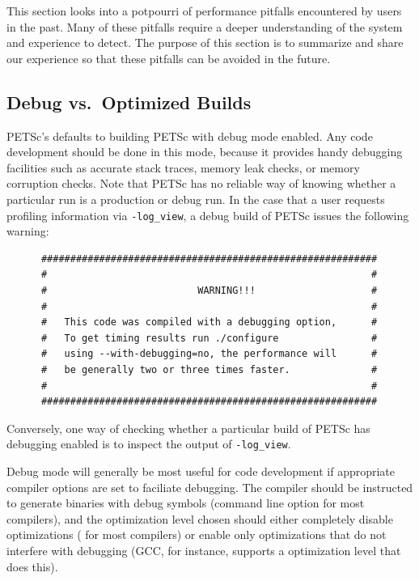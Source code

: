 {{This section looks into a potpourri of performance pitfalls encountered by users in the past.
Many of these pitfalls require a deeper understanding of the system and experience to detect.
The purpose of this section is to summarize and share our experience so that these pitfalls can be avoided in the future.

\subsection{Debug vs.\ Optimized Builds}

PETSc's  defaults to building PETSc with debug mode enabled.
Any code development should be done in this mode, because it provides handy debugging facilities such as accurate stack traces, memory leak checks, or memory corruption checks.
Note that PETSc has no reliable way of knowing whether a particular run is a production or debug run.
In the case that a user requests profiling information via \lstinline|-log_view|, a debug build of PETSc issues the following warning:
\begin{lstlisting}
      ##########################################################
      #                                                        #
      #                          WARNING!!!                    #
      #                                                        #
      #   This code was compiled with a debugging option,      #
      #   To get timing results run ./configure                #
      #   using --with-debugging=no, the performance will      #
      #   be generally two or three times faster.              #
      #                                                        #
      ##########################################################
\end{lstlisting}
Conversely, one way of checking whether a particular build of PETSc has debugging enabled is to inspect the output of \lstinline|-log_view|.

Debug mode will generally be most useful for code development if appropriate compiler options are set to faciliate debugging.
The compiler should be instructed to generate binaries with debug symbols (command line option  for most compilers), 
and the optimization level chosen should either completely disable optimizations ( for most compilers) or enable only 
optimizations that do not interfere with debugging (GCC, for instance, supports a  optimization level that does this). 

}}
